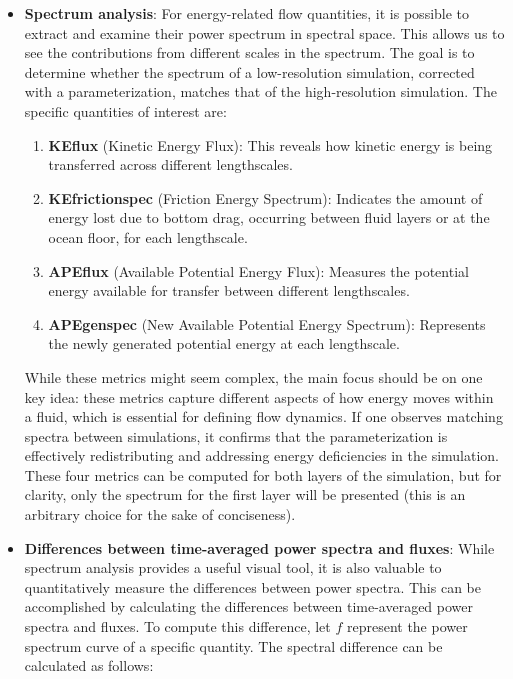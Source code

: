 \begin{itemize}
	\item \textbf{Spectrum analysis}:  For energy-related flow quantities, it is possible to extract and examine their power spectrum in spectral space. This allows us to see the contributions from different scales in the spectrum. The goal is to determine whether the spectrum of a low-resolution simulation, corrected with a parameterization, matches that of the high-resolution simulation. The specific quantities of interest are:
	
\begin{spreadlines}{2em}
\begin{enumerate}
	\item \textbf{KEflux} (Kinetic Energy Flux): This reveals how kinetic energy is being transferred across different lengthscales.
	\item \textbf{KEfrictionspec} (Friction Energy Spectrum): Indicates the amount of energy lost due to bottom drag, occurring between fluid layers or at the ocean floor, for each lengthscale.
	\item \textbf{APEflux} (Available Potential Energy Flux): Measures the potential energy available for transfer between different lengthscales.
	\item \textbf{APEgenspec} (New Available Potential Energy Spectrum): Represents the newly generated potential energy at each lengthscale.
\end{enumerate}
\end{spreadlines}

While these metrics might seem complex, the main focus should be on one key idea: these metrics capture different aspects of how energy moves within a fluid, which is essential for defining flow dynamics. If one observes matching spectra between simulations, it confirms that the parameterization is effectively redistributing and addressing energy deficiencies in the simulation. These four metrics can be computed for both layers of the simulation, but for clarity, only the spectrum for the first layer will be presented (this is an arbitrary choice for the sake of conciseness).

	
\item \textbf{Differences between time-averaged power spectra and fluxes}: While spectrum analysis provides a useful visual tool, it is also valuable to quantitatively measure the differences between power spectra. This can be accomplished by calculating the differences between time-averaged power spectra and fluxes. To compute this difference, let $f$ represent the power spectrum curve of a specific quantity. The spectral difference can be calculated as follows:


\end{itemize}
